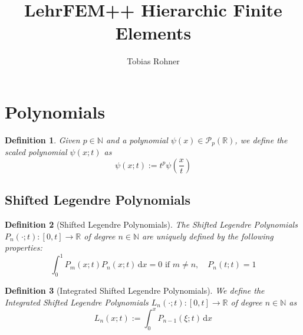 \documentclass[10pt,a4paper]{article}
\author{Tobias Rohner}
\title{LehrFEM++ Hierarchic Finite Elements}
\newtheorem{defn}{Definition}
\begin{document}
    
\maketitle

\section{Polynomials}

    \begin{defn}
        Given $p \in \mathbb{N}$ and a polynomial $\psi(x) \in \mathcal{P}_p(\mathbb{R})$, we define the scaled polynomial $\psi(x;t)$ as
        \begin{equation*}
            \psi(x;t) := t^p\psi\left(\frac{x}{t}\right)
        \end{equation*}
    \end{defn}


\subsection{Shifted Legendre Polynomials}

    \begin{defn}[Shifted Legendre Polynomials]
        The Shifted Legendre Polynomials $P_n(\cdot;t) : [0, t] \to \mathbb{R}$ of degree $n \in \mathbb{N}$ are uniquely defined by the following properties:
        \begin{equation*}
            \int_0^1\! P_m(x;t)P_n(x;t) \,\mathrm{d}x = 0 \mbox{ if } m \neq n, \quad P_n(t;t) = 1
        \end{equation*}
    \end{defn}

    \begin{defn}[Integrated Shifted Legendre Polynomials]
        We define the Integrated Shifted Legendre Polynomials $L_n(\cdot;t) : [0, t] \to \mathbb{R}$ of degree $n \in \mathbb{N}$ as
        \begin{equation*}
            L_n(x;t) := \int_0^x\! P_{n-1}(\xi;t) \,\mathrm{d}x
        \end{equation*}
    \end{defn}
    
\end{document}
